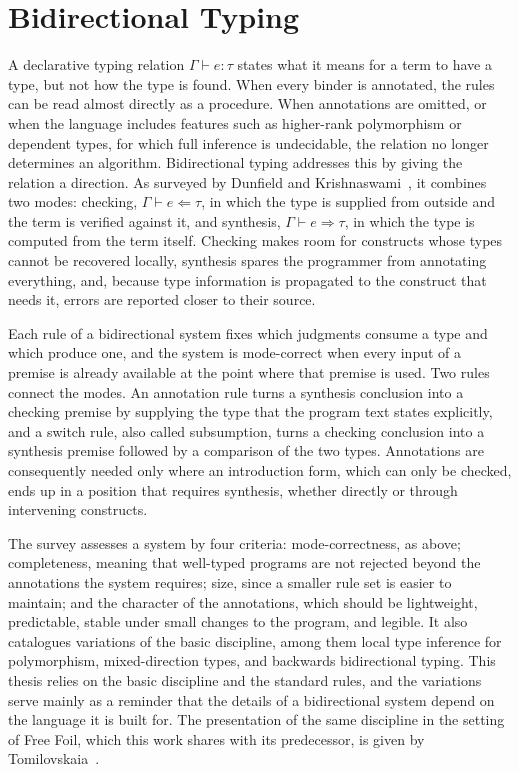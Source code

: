 \section{Bidirectional Typing}
\label{sec:lr-bidir}

A declarative typing relation $\Gamma \vdash e : \tau$ states what it means for a term to have a type, but not how the type is found. When every binder is annotated, the rules can be read almost directly as a procedure. When annotations are omitted, or when the language includes features such as higher-rank polymorphism or dependent types, for which full inference is undecidable, the relation no longer determines an algorithm. Bidirectional typing addresses this by giving the relation a direction. As surveyed by Dunfield and Krishnaswami~\cite{dunfield2021bidirectional}, it combines two modes: checking, $\Gamma \vdash e \Leftarrow \tau$, in which the type is supplied from outside and the term is verified against it, and synthesis, $\Gamma \vdash e \Rightarrow \tau$, in which the type is computed from the term itself. Checking makes room for constructs whose types cannot be recovered locally, synthesis spares the programmer from annotating everything, and, because type information is propagated to the construct that needs it, errors are reported closer to their source.

Each rule of a bidirectional system fixes which judgments consume a type and which produce one, and the system is mode-correct when every input of a premise is already available at the point where that premise is used. Two rules connect the modes. An annotation rule turns a synthesis conclusion into a checking premise by supplying the type that the program text states explicitly, and a switch rule, also called subsumption, turns a checking conclusion into a synthesis premise followed by a comparison of the two types. Annotations are consequently needed only where an introduction form, which can only be checked, ends up in a position that requires synthesis, whether directly or through intervening constructs.

The survey assesses a system by four criteria: mode-correctness, as above; completeness, meaning that well-typed programs are not rejected beyond the annotations the system requires; size, since a smaller rule set is easier to maintain; and the character of the annotations, which should be lightweight, predictable, stable under small changes to the program, and legible. It also catalogues variations of the basic discipline, among them local type inference for polymorphism, mixed-direction types, and backwards bidirectional typing. This thesis relies on the basic discipline and the standard rules, and the variations serve mainly as a reminder that the details of a bidirectional system depend on the language it is built for. The presentation of the same discipline in the setting of Free Foil, which this work shares with its predecessor, is given by Tomilovskaia~\cite[Sec.~2.2]{tomilovskaia2025bidir}.

